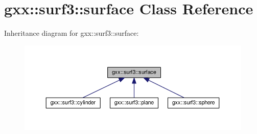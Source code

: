 \hypertarget{classgxx_1_1surf3_1_1surface}{}\section{gxx\+:\+:surf3\+:\+:surface Class Reference}
\label{classgxx_1_1surf3_1_1surface}


Inheritance diagram for gxx\+:\+:surf3\+:\+:surface\+:
\nopagebreak
\begin{figure}[H]
\begin{center}
\leavevmode
\includegraphics[width=350pt]{classgxx_1_1surf3_1_1surface__inherit__graph}
\end{center}
\end{figure}
